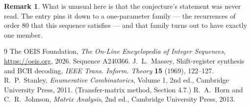\documentclass[11pt,a4paper]{article}
\theoremstyle{plain}
\theoremstyle{definition}
\newtheorem{remark}[theorem]{Remark}
\begin{document}
\begin{remark}
What is unusual here is that the conjecture's statement was never read. The entry pins it down
to a one-parameter family --- the recurrences of order $80$ that this sequence satisfies
--- and that family turns out to have exactly one member.
\end{remark}

\begin{thebibliography}{9}
 The OEIS Foundation, \emph{The On-Line Encyclopedia of Integer
Sequences}, \url{https://oeis.org}, 2026. Sequence A240366.
 J.~L.~Massey, Shift-register synthesis and BCH decoding, \emph{IEEE
Trans. Inform. Theory} \textbf{15} (1969), 122--127.
 R.~P.~Stanley, \emph{Enumerative Combinatorics}, Volume 1, 2nd ed.,
Cambridge University Press, 2011. (Transfer-matrix method, Section 4.7.)
 R.~A.~Horn and C.~R.~Johnson, \emph{Matrix Analysis}, 2nd ed., Cambridge
University Press, 2013.
\end{thebibliography}
\end{document}
